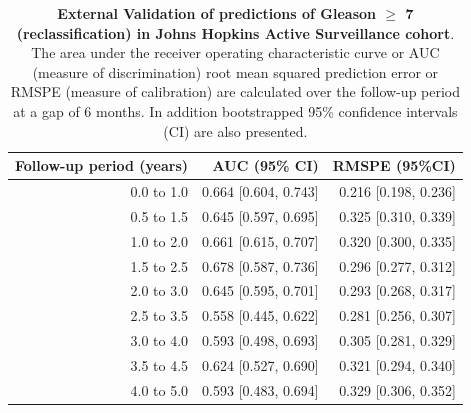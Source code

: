 \begin{table}[!htb]
\small\sf\centering
\caption{\textbf{External Validation of predictions of Gleason $\geq$ 7 (reclassification) in Johns Hopkins Active Surveillance cohort}. The area under the receiver operating characteristic curve or AUC (measure of discrimination) root mean squared prediction error or RMSPE (measure of calibration) are calculated over the follow-up period at a gap of 6 months. In addition bootstrapped 95\% confidence intervals (CI) are also presented.}
\label{tab:AUC_PE_JHAS}
\begin{tabular}{r|r|r}
\hline
\hline
Follow-up period (years) & AUC (95\% CI) & RMSPE (95\%CI)\\ 
\hline
0.0 to 1.0 & 0.664 [0.604, 0.743] & 0.216 [0.198, 0.236]\\
0.5 to 1.5 & 0.645 [0.597, 0.695] & 0.325 [0.310, 0.339]\\
1.0 to 2.0 & 0.661 [0.615, 0.707] & 0.320 [0.300, 0.335]\\
1.5 to 2.5 & 0.678 [0.587, 0.736] & 0.296 [0.277, 0.312]\\
2.0 to 3.0 & 0.645 [0.595, 0.701] & 0.293 [0.268, 0.317]\\
2.5 to 3.5 & 0.558 [0.445, 0.622] & 0.281 [0.256, 0.307]\\
3.0 to 4.0 & 0.593 [0.498, 0.693] & 0.305 [0.281, 0.329]\\
3.5 to 4.5 & 0.624 [0.527, 0.690] & 0.321 [0.294, 0.340]\\
4.0 to 5.0 & 0.593 [0.483, 0.694] & 0.329 [0.306, 0.352]\\
\hline
\end{tabular}	
\end{table}

